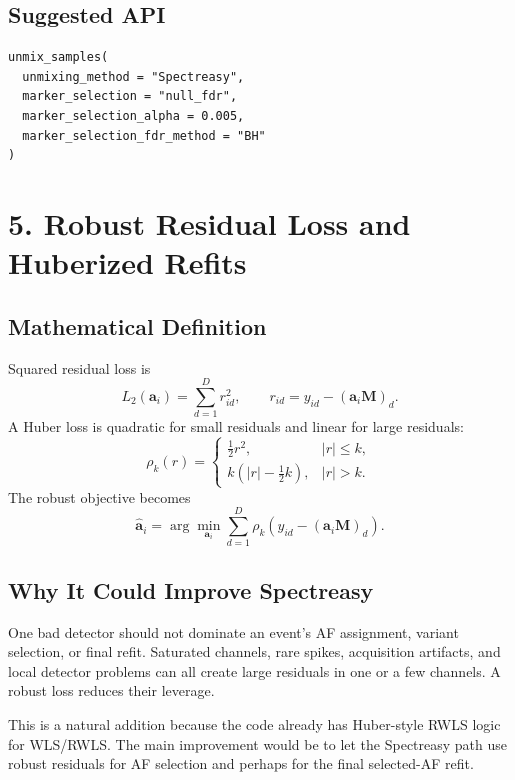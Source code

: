 \documentclass[11pt]{article}
\newcommand{\M}{\mathbf{M}}
\newcommand{\aev}{\mathbf{a}}
\begin{document}
\subsection*{Suggested API}

\begin{verbatim}
unmix_samples(
  unmixing_method = "Spectreasy",
  marker_selection = "null_fdr",
  marker_selection_alpha = 0.005,
  marker_selection_fdr_method = "BH"
)
\end{verbatim}

\section{5. Robust Residual Loss and Huberized Refits}

\subsection*{Mathematical Definition}

Squared residual loss is
\begin{equation}
  L_2(\aev_i)
  =
  \sum_{d=1}^{D}
  r_{id}^2,
  \qquad
  r_{id} = y_{id} - (\aev_i\M)_d.
\end{equation}
A Huber loss is quadratic for small residuals and linear for large residuals:
\begin{equation}
  \rho_k(r)
  =
  \begin{cases}
    \frac{1}{2}r^2, & |r| \leq k, \\
    k(|r|-\frac{1}{2}k), & |r| > k.
  \end{cases}
\end{equation}
The robust objective becomes
\begin{equation}
  \hat{\aev}_i
  =
  \arg\min_{\aev_i}
  \sum_{d=1}^{D}
  \rho_k
  \left(
    y_{id} - (\aev_i\M)_d
  \right).
\end{equation}

\subsection*{Why It Could Improve Spectreasy}

One bad detector should not dominate an event's AF assignment, variant
selection, or final refit. Saturated channels, rare spikes, acquisition
artifacts, and local detector problems can all create large residuals in one or
a few channels. A robust loss reduces their leverage.

This is a natural addition because the code already has Huber-style RWLS logic
for WLS/RWLS. The main improvement would be to let the Spectreasy path use
robust residuals for AF selection and perhaps for the final selected-AF refit.
\end{document}
